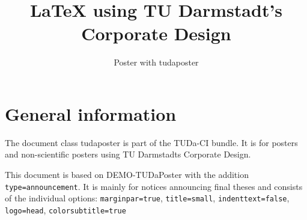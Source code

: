 \documentclass[
	english,%
	paper=a4,%
	accentcolor=9c,%
	type=announcement,
	footer=true,
]{tudaposter}
\title{\LaTeX{} using TU Darmstadt's Corporate Design}
\subtitle{Poster with tudaposter}
\newcommand*{\code}[1]{\texttt{#1}}
\begin{document}
\maketitle

\section*{General information}

The document class tudaposter is part of the TUDa-CI bundle. It is for posters and non-scientific posters using TU Darmstadts Corporate Design.

This document is based on DEMO-TUDaPoster with the addition \code{type=announcement}.
It is mainly for notices announcing final theses and consists of the individual options: \code{marginpar=true}, \code{title=small}, \code{indenttext=false}, \code{logo=head}, \code{colorsubtitle=true}
\end{document}
